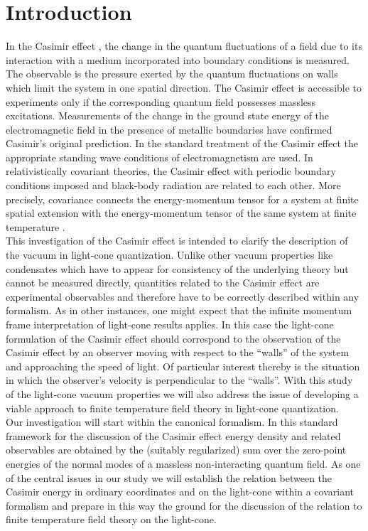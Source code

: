 \documentclass[a4paper,twocolumn,eqsecnum,aps]{revtex4}
\begin{document}
\section{Introduction}
In the Casimir effect \cite{casimir}, the change in the quantum fluctuations of a  field due to its interaction with a medium incorporated into boundary conditions is measured. The observable is the  pressure exerted by the quantum fluctuations on  walls which limit the system in one spatial direction. The Casimir effect is accessible to experiments only if the corresponding quantum field possesses massless excitations. Measurements \cite{sparnaay,roy,ono} of the change in the ground state energy of the electromagnetic field in the presence of metallic boundaries have confirmed Casimir's original prediction. In the standard treatment of the Casimir effect the appropriate standing wave conditions of  electromagnetism are used. In relativistically covariant theories, the Casimir effect with periodic boundary conditions imposed and black-body radiation are related to each other. More precisely, covariance connects the energy-momentum tensor for a system at finite spatial extension with the energy-momentum tensor of the same system at finite temperature \cite{lt98,toms}. \\
This investigation of the Casimir effect  is intended to clarify the description of the vacuum in light-cone quantization. Unlike other vacuum properties like condensates which have to  appear for consistency of the underlying theory  but cannot be measured directly, quantities related to the Casimir effect are experimental observables and therefore have to be correctly described within any formalism.
As in other instances, one might expect that the infinite momentum frame interpretation of light-cone results applies. In this case the light-cone formulation of the Casimir effect should correspond to the observation of the Casimir effect by an observer moving with respect to the ``walls'' of the system and approaching the speed of light. Of particular interest thereby is the situation in which the observer's velocity is perpendicular to the ``walls''.
 With this study of the light-cone vacuum properties we will also address the issue of developing a viable approach to finite temperature field theory in  light-cone quantization.\\
Our investigation will start within the canonical formalism. In this standard framework for the discussion of the Casimir effect \cite{itzykson} energy density and related observables are obtained by the (suitably regularized) sum over the zero-point energies of the normal modes of a massless non-interacting quantum field. As one of the central issues in our study we will  establish the relation between the Casimir energy in ordinary coordinates and on the light-cone  within a covariant formalism and prepare in this way the ground for the discussion of the relation to finite temperature field theory on the light-cone.  
\end{document}

